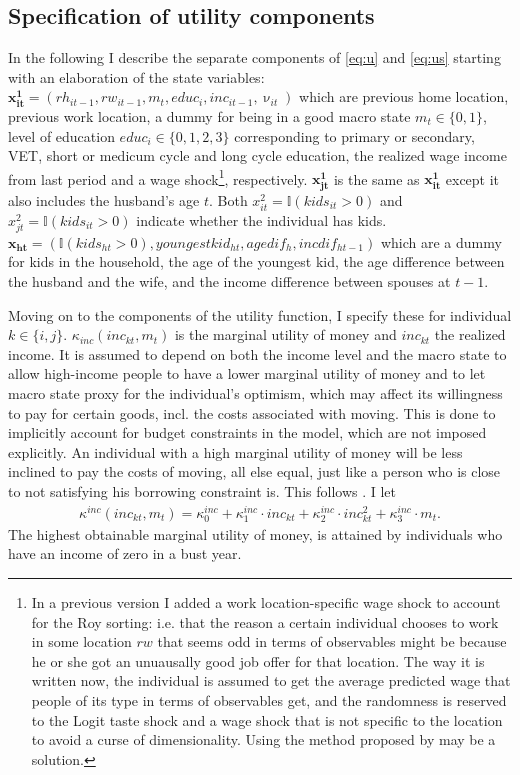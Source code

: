 \subsection{Specification of utility components}\label{subsec:utilcomp}
In the following I describe the separate components of \eqref{eq:u} and \eqref{eq:us} starting with an elaboration of the state variables: $\boldsymbol{x_{it}^1}=(rh_{it-1},rw_{it-1},m_t,educ_i,inc_{it-1},\upnu_{it})$ which are previous home location, previous work location, a dummy for being in a good macro state $m_t\in\{0,1\}$, level of education $educ_{i}\in\{0,1,2,3\}$ corresponding to primary or secondary, VET, short or medicum cycle and long cycle education, the realized wage income from last period and a wage shock\footnote{In a previous version I added a work location-specific wage shock to account for the Roy sorting: i.e. that the reason a certain individual chooses to work in some location $rw$ that seems odd in terms of observables might be because he or she got an unuausally good job offer for that location. The way it is written now, the individual is assumed to get the average predicted wage that people of its type in terms of observables get, and the randomness is reserved to the Logit taste shock and a wage shock that is not specific to the location to avoid a curse of dimensionality. Using the method proposed by \citet{Dahl2002} may be a solution.}, respectively. $\boldsymbol{x_{jt}^1}$ is the same as $\boldsymbol{x_{it}^1}$ except it also includes the husband's age $t$. Both $x_{it}^2=\mathbb{I}{(kids_{it}>0)}$ and $x_{jt}^2=\mathbb{I}{(kids_{it}>0)}$ indicate whether the individual has kids. ${\boldsymbol{x_{ht}}}=(\mathbb{I}{(kids_{ht}>0)},youngestkid_{ht},agedif_h,incdif_{ht-1})$ which are a dummy for kids in the household, the age of the youngest kid, the age difference between the husband and the wife, and the income difference between spouses at $t-1$.

Moving on to the components of the utility function, I specify these for individual $k\in\{i,j\}$. $\kappa_{inc}(inc_{kt},m_t)$ is the marginal utility of money and $inc_{kt}$ the realized income. It is assumed to depend on both the income level and the macro state to allow high-income people to have a lower marginal utility of money and to let macro state proxy for the individual's optimism, which may affect its willingness to pay for certain goods, incl. the costs associated with moving. This is done to implicitly account for budget constraints in the model, which are not imposed explicitly. An individual with a high marginal utility of money will be less inclined to pay the costs of moving, all else equal, just like a person who is close to not satisfying his borrowing constraint is. This follows \citet{GillinghamEtAl2015}. I let
\begin{align*}
\kappa^{inc}(inc_{kt},m_t)=\kappa_0^{inc}+\kappa_1^{inc}\cdot inc_{kt}+\kappa_2^{inc}\cdot inc_{kt}^2+\kappa_3^{inc}\cdot m_t.
\end{align*}
The highest obtainable marginal utility of money, is attained by individuals who have an income of zero in a bust year. 

